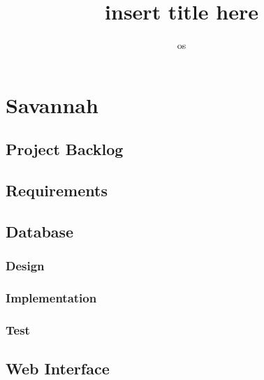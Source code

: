 

\title{insert title here} %
\author{os} %


\maketitle
\tableofcontents
  
%	

\chapter{Savannah} %
		
    
  \section{Project Backlog}
    \label{sect:pback}
    

  \section{Requirements} %
  \section{Database}
      
    \subsection{Design}
      
    \subsection{Implementation}
      
    \subsection{Test}
      
  
  \section{Web Interface}
    \label{sect:webInterface}
